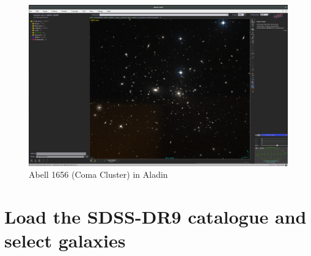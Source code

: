 \documentclass [a4paper, 12pt]{article}
\newcommand{\aladin}{{\textsc{A}{ladin}}}
\begin{document}
\begin{figure}[H]
\center
\includegraphics[width=0.85 \textwidth]{../images/aladin_a1656_new.png}
\caption{Abell 1656 (Coma Cluster) in \aladin}
\label{fig:aladinA1656}
\end{figure}

\section{Load the SDSS-DR9 catalogue and select galaxies}
\end{document}
